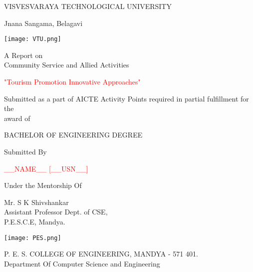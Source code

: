 \thispagestyle{empty}



\begin{center}

    \fontsize{18}{20}\selectfont \textcolor{blue1}{VISVESVARAYA TECHNOLOGICAL UNIVERSITY}

    \vspace{0.1cm}

    \fontsize{16}{20}\selectfont \textcolor{blue1}{Jnana Sangama, Belagavi}

    \vspace{0.7cm}
    
    \texttt{[image: VTU.png]}

    \vspace{0.3cm}

    \fontsize{16}{20}\selectfont A Report on \\
    Community Service and Allied Activities

    \fontsize{18}{20}\selectfont \textcolor{red}{"Tourism Promotion Innovative Approaches"}

    \fontsize{13}{20}\selectfont Submitted as a part of AICTE Activity Points required in partial fulfillment for the \\
    \vspace{-0.5cm}
    award of

    \fontsize{14}{20}\selectfont BACHELOR OF ENGINEERING DEGREE

    \fontsize{16}{20}\selectfont \textcolor{blue2}{Submitted By}

    \fontsize{16}{20}\selectfont \textcolor{red}{__NAME__ [__USN__]}


    \fontsize{15}{20}\selectfont \textcolor{blue2}{Under the Mentorship Of}

    \fontsize{14}{20}\selectfont Mr. S K Shivshankar \\ \vspace{-0.25cm} Assistant Professor Dept. of CSE, \\  
    \vspace{-0.25cm}  P.E.S.C.E, Mandya.

    \vspace{0.5cm}

    \texttt{[image: PES.png]}

    \fontsize{14}{20}\selectfont P. E. S. COLLEGE OF ENGINEERING, MANDYA - 571 401. \\ \vspace{-0.4cm}Department Of Computer Science and Engineering

    
\end{center}
